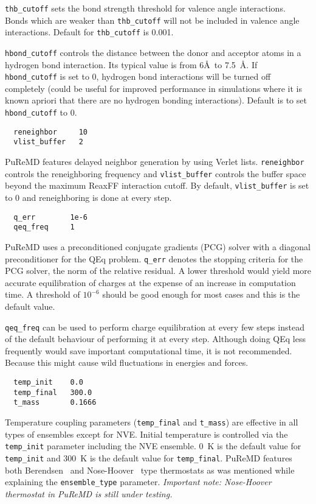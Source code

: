 \documentclass{article}
\begin{document}
{\tt thb\_cutoff} sets the bond strength threshold for valence angle 
interactions. Bonds which are weaker than {\tt thb\_cutoff} will not 
be included in valence angle interactions. Default for {\tt thb\_cutoff} 
is 0.001.

{\tt hbond\_cutoff} controls the distance between the donor and acceptor 
atoms in a hydrogen bond interaction. Its typical value is from 6\AA\ to 
7.5~\AA. If {\tt hbond\_cutoff} is set to 0, hydrogen bond interactions 
will be turned off completely (could be useful for improved
performance in simulations where it is known apriori that there are no 
hydrogen bonding interactions). Default is to set {\tt hbond\_cutoff} to 0.

\begin{verbatim}
  reneighbor     10
  vlist_buffer   2 
\end{verbatim}
PuReMD features delayed neighbor generation by using Verlet lists. 
{\tt reneighbor} controls the reneighboring frequency and {\tt vlist\_buffer} 
controls the buffer space beyond the maximum ReaxFF interaction cutoff. 
By default, {\tt vlist\_buffer} is set to 0 and reneighboring is done at 
every step.

\begin{verbatim}
  q_err        1e-6
  qeq_freq     1
\end{verbatim}
PuReMD uses a preconditioned conjugate gradients (PCG) solver with a 
diagonal preconditioner for the QEq problem. {\tt q\_err} denotes the 
stopping criteria for the PCG solver, the norm of the relative residual. 
A lower threshold would yield more accurate equilibration of charges at 
the expense of an increase in computation time. A threshold of $10^{-6}$ 
should be good enough for most cases and this is the default value.

{\tt qeq\_freq} can be used to perform charge equilibration at every 
few steps instead of the default behaviour of performing it at every 
step. Although doing QEq less frequently would save important 
computational time, it is not recommended. Because this might cause wild 
fluctuations in energies and forces.

\begin{verbatim}
  temp_init    0.0
  temp_final   300.0
  t_mass       0.1666
\end{verbatim}
Temperature coupling parameters ({\tt temp\_final} and {\tt t\_mass}) are 
effective in all types of ensembles except for NVE. Initial temperature 
is controlled via the {\tt temp\_init} parameter including the NVE ensemble.
0~K is the default value for {\tt temp\_init} and 300~K is the default value 
for {\tt temp\_final}. PuReMD features both Berendsen~\cite{ref:berendsen} 
and Nose-Hoover~\cite{ref:klein} type thermostats as was mentioned while 
explaining the {\tt ensemble\_type} parameter.
\emph{Important note: Nose-Hoover thermostat in PuReMD is still under testing.}
\end{document}
